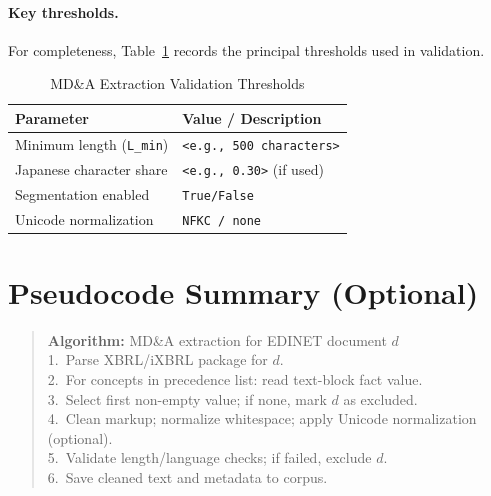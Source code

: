 \paragraph{Key thresholds.}
For completeness, Table~\ref{tab:mdna_thresholds} records the principal thresholds used in validation.

\begin{table}[h]
\centering
\caption{MD\&A Extraction Validation Thresholds}
\label{tab:mdna_thresholds}
\begin{tabular}{ll}
\toprule
\textbf{Parameter} & \textbf{Value / Description} \\
\midrule
Minimum length (\texttt{L\_min}) & \texttt{<e.g., 500 characters>} \\
Japanese character share & \texttt{<e.g., 0.30>} (if used) \\
Segmentation enabled & \texttt{True/False} \\
Unicode normalization & \texttt{NFKC / none} \\
\bottomrule
\end{tabular}
\end{table}

\section{Pseudocode Summary (Optional)}
\label{appendix:mdna_pseudocode}

\begin{quote}\small
\textbf{Algorithm:} MD\&A extraction for EDINET document $d$ \\
1.\ Parse XBRL/iXBRL package for $d$. \\
2.\ For concepts in precedence list: read text-block fact value. \\
3.\ Select first non-empty value; if none, mark $d$ as excluded. \\
4.\ Clean markup; normalize whitespace; apply Unicode normalization (optional). \\
5.\ Validate length/language checks; if failed, exclude $d$. \\
6.\ Save cleaned text and metadata to corpus.
\end{quote}
